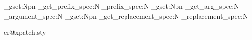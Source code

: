
\usepackage{etoolbox}
\usepackage{xstring}
\usepackage{expl3}
\usepackage{xparse}
\usepackage{letltxmacro}
\usepackage{regexpatch}

\makeatletter
\ExplSyntaxOn

  {} %
  {
      {
        \cs_gset:Npn \token_get_prefix_spec:N { \cs_prefix_spec:N }
        \cs_gset:Npn \token_get_arg_spec:N { \cs_argument_spec:N }
        \cs_gset:Npn \token_get_replacement_spec:N { \cs_replacement_spec:N }
      }
      {} %
  }
\ExplSyntaxOff
\makeatother

\expandafter\xdef\csname ver@xpatch.sty

\usepackage{calc}

